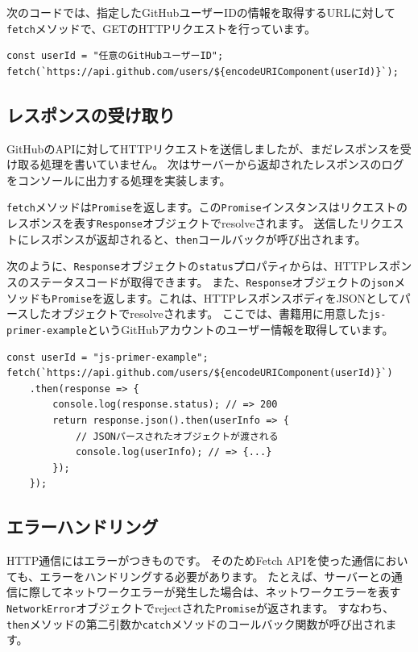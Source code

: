 次のコードでは、指定したGitHubユーザーIDの情報を取得するURLに対して\texttt{fetch}メソッドで、GETのHTTPリクエストを行っています。

\begin{lstlisting}
const userId = "任意のGitHubユーザーID";
fetch(`https://api.github.com/users/${encodeURIComponent(userId)}`);
\end{lstlisting}

\hypertarget{receive-response}{%
\subsection{レスポンスの受け取り}\label{receive-response}}

GitHubのAPIに対してHTTPリクエストを送信しましたが、まだレスポンスを受け取る処理を書いていません。
次はサーバーから返却されたレスポンスのログをコンソールに出力する処理を実装します。

\texttt{fetch}メソッドは\texttt{Promise}を返します。この\texttt{Promise}インスタンスはリクエストのレスポンスを表す\texttt{Response}オブジェクトでresolveされます。
送信したリクエストにレスポンスが返却されると、\texttt{then}コールバックが呼び出されます。

次のように、\texttt{Response}オブジェクトの\texttt{status}プロパティからは、HTTPレスポンスのステータスコードが取得できます。
また、\texttt{Response}オブジェクトの\texttt{json}メソッドも\texttt{Promise}を返します。これは、HTTPレスポンスボディをJSONとしてパースしたオブジェクトでresolveされます。
ここでは、書籍用に用意した\texttt{js-primer-example}というGitHubアカウントのユーザー情報を取得しています。

\begin{lstlisting}
const userId = "js-primer-example";
fetch(`https://api.github.com/users/${encodeURIComponent(userId)}`)
    .then(response => {
        console.log(response.status); // => 200
        return response.json().then(userInfo => {
            // JSONパースされたオブジェクトが渡される
            console.log(userInfo); // => {...}
        });
    });
\end{lstlisting}

\hypertarget{error-handling}{%
\subsection{エラーハンドリング}\label{error-handling}}

HTTP通信にはエラーがつきものです。 そのためFetch
APIを使った通信においても、エラーをハンドリングする必要があります。
たとえば、サーバーとの通信に際してネットワークエラーが発生した場合は、ネットワークエラーを表す\texttt{NetworkError}オブジェクトでrejectされた\texttt{Promise}が返されます。
すなわち、\texttt{then}メソッドの第二引数か\texttt{catch}メソッドのコールバック関数が呼び出されます。

